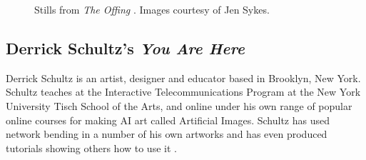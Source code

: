 \begin{figure}[!htbp]
    \caption[Stills from \textit{The Offing}]{Stills from \textit{The Offing} \citep{sykes2022offing}. Images courtesy of Jen Sykes.}
    \label{fig:c7:offing}
 \end{figure}

\subsection{Derrick Schultz's \textit{You Are Here}}
\label{c7:subsubsec:schultz}

Derrick Schultz is an artist, designer and educator based in Brooklyn, New York. Schultz teaches at the Interactive Telecommunications Program at the New York University Tisch School of the Arts, and online under his own range of popular online courses for making AI art called Artificial Images. 
Schultz has used network bending in a number of his own artworks and has even produced tutorials showing others how to use it \citep{schultz2020netbending}. 

